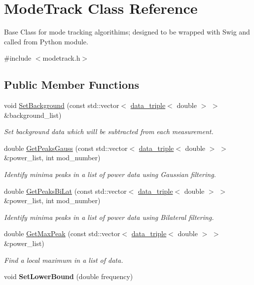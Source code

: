 \hypertarget{class_mode_track}{}\section{Mode\+Track Class Reference}
\label{class_mode_track}


Base Class for mode tracking algorithims; designed to be wrapped with Swig and called from Python module.  




{\ttfamily \#include $<$modetrack.\+h$>$}

\subsection*{Public Member Functions}
\begin{DoxyCompactItemize}
\item 
void \hyperlink{class_mode_track_a3163e67113b3a93cb9fde40cba8dc813}{Set\+Background} (const std\+::vector$<$ \hyperlink{structdata__triple}{data\+\_\+triple}$<$ double $>$ $>$ \&background\+\_\+list)
\begin{DoxyCompactList}\small\item\em Set background data which will be subtracted from each measurement. \end{DoxyCompactList}\item 
double \hyperlink{class_mode_track_a2b3cc468fae5bca487871ad2b71fc974}{Get\+Peaks\+Gauss} (const std\+::vector$<$ \hyperlink{structdata__triple}{data\+\_\+triple}$<$ double $>$ $>$ \&power\+\_\+list, int mod\+\_\+number)
\begin{DoxyCompactList}\small\item\em Identify minima peaks in a list of power data using Gaussian filtering. \end{DoxyCompactList}\item 
double \hyperlink{class_mode_track_a974e74566b3baf1343d5942a6af7445e}{Get\+Peaks\+Bi\+Lat} (const std\+::vector$<$ \hyperlink{structdata__triple}{data\+\_\+triple}$<$ double $>$ $>$ \&power\+\_\+list, int mod\+\_\+number)
\begin{DoxyCompactList}\small\item\em Identify minima peaks in a list of power data using Bilateral filtering. \end{DoxyCompactList}\item 
double \hyperlink{class_mode_track_ab471ed8393b84636edb129d1c77b4df4}{Get\+Max\+Peak} (const std\+::vector$<$ \hyperlink{structdata__triple}{data\+\_\+triple}$<$ double $>$ $>$ \&power\+\_\+list)
\begin{DoxyCompactList}\small\item\em Find a local maximum in a list of data. \end{DoxyCompactList}\item 
void {\bfseries Set\+Lower\+Bound} (double frequency)\hypertarget{class_mode_track_a99eeeb6757873474994a61dbd7e31e43}{}\label{class_mode_track_a99eeeb6757873474994a61dbd7e31e43}


\end{DoxyCompactItemize}
